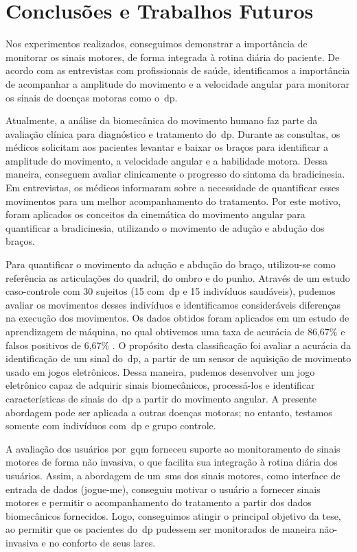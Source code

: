 \chapter{Conclusões e Trabalhos Futuros}\label{chapter:conclusoes_futuros}
Nos experimentos realizados, conseguimos demonstrar a importância de monitorar os sinais motores, de forma integrada à rotina diária do paciente. De acordo com as entrevistas com profissionais de saúde, identificamos a importância de acompanhar a amplitude do movimento e a velocidade angular para monitorar os sinais de doenças motoras como o~\ac{dp}.

Atualmente, a análise da biomecânica do movimento humano faz parte da avaliação clínica para diagnóstico e tratamento do~\ac{dp}. Durante as consultas, os médicos solicitam aos pacientes levantar e baixar os braços para identificar a amplitude do movimento, a velocidade angular e a habilidade motora. Dessa maneira, conseguem avaliar clinicamente o progresso do sintoma da bradicinesia. Em entrevistas, os médicos informaram sobre a necessidade de quantificar esses movimentos para um melhor acompanhamento do tratamento. Por este motivo, foram aplicados os conceitos da cinemática do movimento angular para quantificar a bradicinesia, utilizando o movimento de adução e abdução dos braços.

Para quantificar o movimento da adução e abdução do braço, utilizou-se como referência as articulações do quadril, do ombro e do punho. Através de um estudo caso-controle com 30 sujeitos (15 com~\ac{dp} e 15 indivíduos saudáveis), pudemos avaliar os movimentos desses indivíduos e identificamos consideráveis diferenças na execução dos movimentos. Os dados obtidos foram aplicados em um estudo de aprendizagem de máquina, no qual obtivemos uma taxa de acurácia de 86,67\% e falsos positivos de 6,67\% . O propósito desta classificação foi avaliar a acurácia da identificação de um sinal do~\ac{dp}, a partir de um sensor de aquisição de movimento usado em jogos eletrônicos. Dessa maneira, pudemos desenvolver um jogo eletrônico  capaz de adquirir sinais biomecânicos, processá-los e identificar características de sinais do~\ac{dp} a partir do movimento angular. A presente abordagem pode ser aplicada a outras doenças motoras; no entanto, testamos somente com indivíduos com~\ac{dp} e grupo controle.

A avaliação dos usuários por~\ac{gqm} forneceu suporte ao monitoramento de sinais motores de forma não invasiva, o que facilita sua integração à rotina diária dos usuários. Assim, a abordagem de um~\ac{sms} dos sinais motores, como interface de entrada de dados (\ac{jogue-me}), conseguiu motivar o usuário  a fornecer sinais motores e permitir o acompanhamento do tratamento a partir dos dados biomecânicos fornecidos. Logo, conseguimos atingir o principal objetivo da tese, ao permitir que os pacientes do~\ac{dp} pudessem ser monitorados de maneira não-invasiva e no conforto de seus lares.

